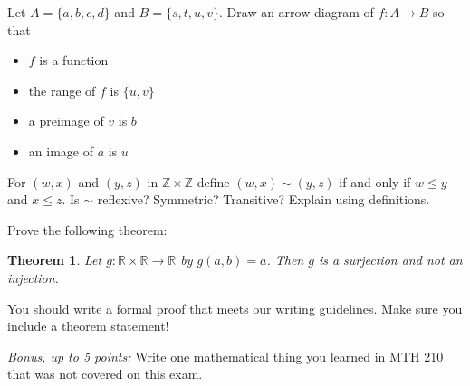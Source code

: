 \documentclass[11pt]{exam}
\newtheorem*{thm}{Theorem}
\newcommand{\Z}{\mathbb{Z}}
\newcommand{\R}{\mathbb{R}}
\begin{document}
\begin{questions}
\question[10] Let $A = \{a,b,c,d\}$ and $B= \{s,t,u,v\}$. Draw an arrow diagram of $f: A\to B$ so that
	\begin{itemize}
	\item $f$ is a function
	\item the range of $f$ is $\{u,v\}$
	\item a preimage of $v$ is $b$
	\item an image of $a$ is $u$
	\end{itemize}
\vfill

\question[10] For $(w,x)$ and $(y,z)$ in $\Z\times \Z$ define $(w,x)\sim (y,z)$ if and only if $w\leq y$ and $x\leq z$. Is $\sim$ reflexive? Symmetric? Transitive? Explain using definitions.
\vfill

\newpage

\question[10] Prove the following theorem:
\begin{thm}
Let $g: \R\times\R\to \R$ by $g(a,b) = a$. Then $g$ is a surjection and not an injection.
\end{thm}

You should write a formal proof that meets our writing guidelines. Make sure you include a theorem statement!


\vfill



\question\emph{Bonus, up to 5 points:} Write one mathematical thing you learned in MTH 210 that was not covered on this exam.

\end{questions}
\end{document}
